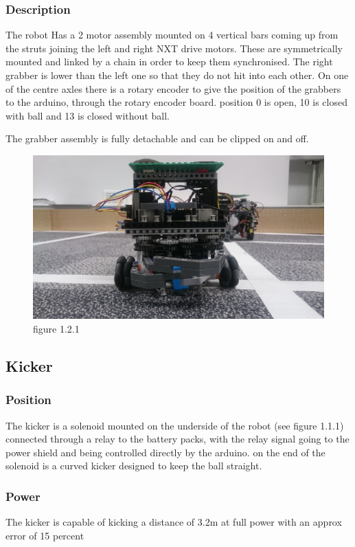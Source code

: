 \documentclass[a4paper]{article}
\begin{document}
\subsubsection{Description}
The robot Has a 2 motor assembly mounted on 4 vertical bars coming up from the struts joining the left and right NXT drive motors. These are symmetrically mounted and linked by a chain in order to keep them synchronised. The right grabber is lower than the left one so that they do not hit into each other. On one of the centre axles there is a rotary encoder to give the position of the grabbers to the arduino, through the rotary encoder board. position 0 is open, 10 is closed with ball and 13 is closed without ball.

The grabber assembly is fully detachable and can be clipped on and off. 
\begin{figure}[!ht]
\caption{figure 1.2.1}
\centering
\includegraphics[width=\textwidth]{DSC_0031.jpg}
\end{figure}

\subsection{Kicker}
\subsubsection{Position}
The kicker is a solenoid mounted on the underside of the robot (see figure 1.1.1) connected through a relay to the battery packs, with the relay signal going to the power shield and being controlled directly by the arduino. on the end of the solenoid is a curved kicker designed to keep the ball straight.

\subsubsection{Power}
The kicker is capable of kicking a distance of 3.2m at full power with an approx error of 15 percent
\end{document}
